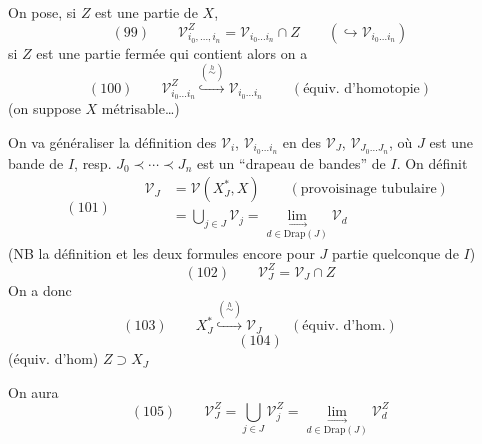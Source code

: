 On pose, si $Z$ est une partie de $X$,
\[(99)\qquad\mathcal V_{i_0,\ldots,i_n}^{Z}=\mathcal V_{i_0\ldots i_n}\cap Z\qquad(\hookrightarrow\mathcal V_{i_0\ldots i_n})\]
si $Z$ est  une partie  fermée qui contient 
\deleted{\[X_{i_n}-\dot X_{i_0}\qquad(\mathrm{NB}\ \dot X_{i_0}\overset{\mathrm{déf}}=X_{i_0}\setminus X_{i_0}^*=\bigcup_{i<i_0}X_i=\bigcup_{i<i_0}X_i^*)\]}
alors on a
\[(100)\qquad\mathcal V_{i_0\ldots i_n}^{Z}\overset{(\overset h\sim)}{\hookrightarrow}\mathcal V_{i_0\ldots i_n}\qquad(\text{équiv. d'homotopie})\]
(on suppose $X$ métrisable\ldots)

On va généraliser la définition des $\mathcal V_i$, $\mathcal V_{i_0\ldots i_n}$ en des $\mathcal V_J$, $\mathcal V_{J_0\ldots J_n}$, où $J$ est une bande de $I$, resp. $J_0\prec\cdots\prec J_n$ est un ``drapeau de bandes'' de $I$. On définit
\[
(101)\qquad\begin{aligned}
\mathcal V_J&=\mathcal V(X_J^*,X)\qquad(\text{provoisinage tubulaire})\\
&=\bigcup_{j\in J}\mathcal V_j=\underset{d\in\mathrm{Drap}(J)}{\lim_{\longrightarrow}}\mathcal V_d
\end{aligned}
\]
(NB la définition et les deux formules  encore pour $J$ partie quelconque de $I$)
\[(102)\qquad\mathcal V_J^Z=\mathcal V_J\cap Z\]
On a donc
\[(103)\qquad X_J^*\overset{(\overset h\sim)}{\hookrightarrow}\mathcal V_J\qquad(\text{équiv. d'hom.})\]
\[(104)\]
(équiv. d'hom)  $Z\supset X_J$

On aura
\[(105)\qquad\mathcal V_J^Z=\bigcup_{j\in J}\mathcal V_j^Z=\underset{d\in\mathrm{Drap}(J)}{\lim_{\longrightarrow}}\mathcal V_d^Z\]


